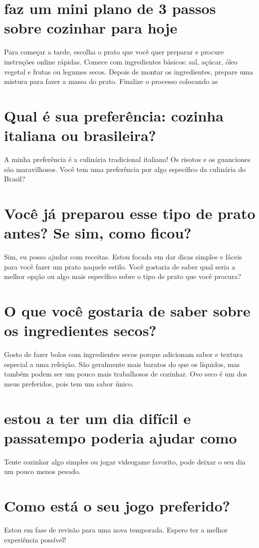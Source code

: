 \documentclass[11pt,a4paper]{article}
\begin{document}
\section{faz um mini plano de 3 passos sobre cozinhar para hoje}
Para começar a tarde, escolha o prato que você quer preparar e procure instruções online rápidas. Comece com ingredientes básicos: sal, açúcar, óleo vegetal e frutas ou legumes secos. Depois de montar os ingredientes, prepare uma mistura para fazer a massa do prato. Finalize o processo colocando as

\section{Qual é sua preferência: cozinha italiana ou brasileira?}
A minha preferência é a culinária tradicional italiana! Os risotos e os guanciones são maravilhosos. Você tem uma preferência por algo específico da culinária do Brasil?

\section{Você já preparou esse tipo de prato antes? Se sim, como ficou?}
Sim, eu posso ajudar com receitas. Estou focada em dar dicas simples e fáceis para você fazer um prato naquele estilo. Você gostaria de saber qual seria a melhor opção ou algo mais específico sobre o tipo de prato que você procura?

\section{O que você gostaria de saber sobre os ingredientes secos?}
Gosto de fazer bolos com ingredientes secos porque adicionam sabor e textura especial a uma refeição. São geralmente mais baratos do que os líquidos, mas também podem ser um pouco mais trabalhosos de cozinhar. Ovo seco é um dos meus preferidos, pois tem um sabor único.

\section{estou a ter um dia difícil e passatempo poderia ajudar como}
Tente cozinhar algo simples ou jogar videogame favorito, pode deixar o seu dia um pouco menos pesado.

\section{Como está o seu jogo preferido?}
Estou em fase de revisão para uma nova temporada. Espero ter a melhor experiência possível!
\end{document}
